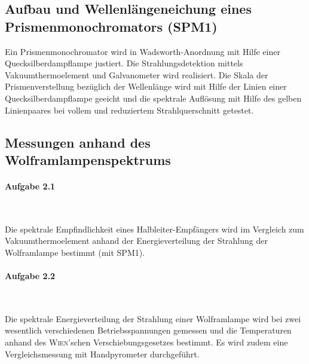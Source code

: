 \documentclass[a4paper,twoside,final]{article}
\begin{document}
\subsection{Aufbau und Wellenlängeneichung eines Prismenmonochromators (SPM1)}

Ein Prismenmonochromator wird in Wadsworth-Anordnung mit Hilfe einer Quecksilberdampflampe justiert. Die Strahlungsdetektion mittels Vakuumthermoelement und Galvanometer wird realisiert. Die Skala der Prismenverstellung bezüglich der Wellenlänge wird mit Hilfe der Linien einer Quecksilberdampflampe geeicht und die spektrale Auflösung mit Hilfe des gelben Linienpaares bei vollem und reduziertem Strahlquerschnitt getestet.

\subsection{Messungen anhand des Wolframlampenspektrums}

\paragraph{Aufgabe 2.1}$~$

Die spektrale Empfindlichkeit eines Halbleiter-Empfängers wird im Vergleich zum Vakuumthermoelement anhand der Energieverteilung der Strahlung der Wolframlampe bestimmt (mit SPM1).

\paragraph{Aufgabe 2.2}$~$

Die spektrale Energieverteilung der Strahlung einer Wolframlampe wird bei zwei wesentlich verschiedenen Betriebsspannungen gemessen und die Temperaturen anhand des \textsc{Wien}'schen Verschiebungsgesetzes bestimmt. Es wird zudem eine Vergleichsmessung mit Handpyrometer durchgeführt.
\end{document}
